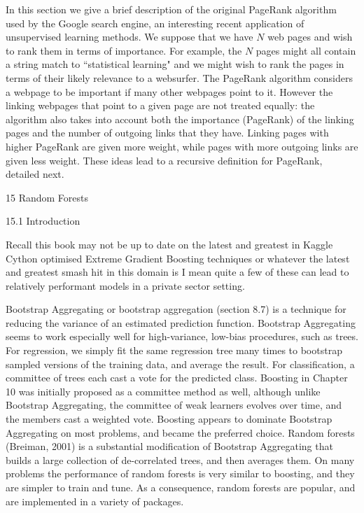 In this section we give a brief description of the original PageRank algorithm used by the Google search engine, an interesting recent application of unsupervised learning methods. We suppose that we have $N$ web pages and wish to rank them in terms of importance. For example, the $N$ pages might all contain a string match to ``statistical learning" and we might wish to rank the pages in terms of their likely relevance to a websurfer. The PageRank algorithm considers a webpage to be important if many other webpages point to it. However the linking webpages that point to a given page are not treated equally: the algorithm also takes into account both the importance (PageRank) of the linking pages and the number of outgoing links that they have. Linking pages with higher PageRank are given more weight, while pages with more outgoing links are given less weight. These ideas lead to a recursive definition for PageRank, detailed next.

15 Random Forests

15.1 Introduction

Recall this book may not be up to date on the latest and greatest in Kaggle Cython optimised Extreme Gradient Boosting techniques or whatever the latest and greatest smash hit in this domain is I mean quite a few of these can lead to relatively performant models in a private sector setting.

Bootstrap Aggregating or bootstrap aggregation (section 8.7) is a technique for reducing the variance of an estimated prediction function. Bootstrap Aggregating seems to work especially well for high-variance, low-bias procedures, such as trees. For regression, we simply fit the same regression tree many times to bootstrap sampled versions of the training data, and average the result. For classification, a committee of trees each cast a vote for the predicted class. Boosting in Chapter 10 was initially proposed as a committee method as well, although unlike Bootstrap Aggregating, the committee of weak learners evolves over time, and the members cast a weighted vote. Boosting appears to dominate Bootstrap Aggregating on most problems, and became the preferred choice. Random forests (Breiman, 2001) is a substantial modification of Bootstrap Aggregating that builds a large collection of de-correlated trees, and then averages them. On many problems the performance of random forests is very similar to boosting, and they are simpler to train and tune. As a consequence, random forests are popular, and are implemented in a variety of packages.

